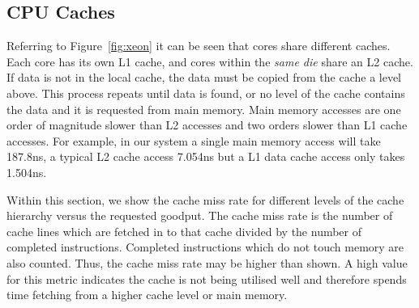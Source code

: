 \documentclass[conference, compsoc]{IEEEtran}
\begin{document}
\subsection{CPU Caches}


Referring to Figure~\ref{fig:xeon} it can be seen that cores share different caches. Each core has its own L1 cache, and cores within the \emph{same die} share an L2 cache. If data is not in the local cache, the data must be copied from the cache a level above. This process repeats until data is found, or no level of the cache contains the data and it is requested from main memory. Main memory accesses are one order of magnitude slower than L2 accesses and two orders slower than L1 cache accesses. For example, in our system a single main memory access will take 187.8ns, a typical L2 cache access 7.054ns but a L1 data cache access only takes 1.504ns.


Within this section, we show the cache miss rate for different levels of the cache hierarchy versus the requested goodput. The cache miss rate is the number of cache lines which are fetched in to that cache divided by the number of completed instructions. Completed instructions which do not touch memory are also counted. Thus, the cache miss rate may be higher than shown. A high value for this metric indicates the cache is not being utilised well and therefore spends time fetching from a higher cache level or main memory.
\end{document}
